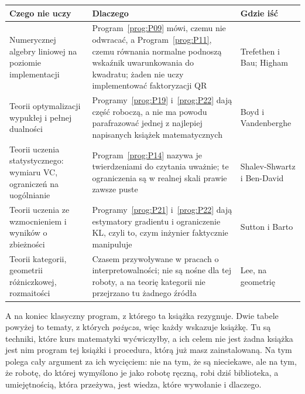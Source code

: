 \begin{center}
\begin{tabularx}{\linewidth}{@{}XXl@{}}
\toprule
\textbf{Czego nie uczy} & \textbf{Dlaczego} & \textbf{Gdzie iść} \\
\midrule
Numerycznej algebry liniowej na poziomie implementacji & Program~\ref{prog:P09}
  mówi, czemu nie odwracać, a Program~\ref{prog:P11}, czemu równania normalne
  podnoszą wskaźnik uwarunkowania do kwadratu; żaden nie uczy implementować
  faktoryzacji QR & Trefethen i Bau; Higham \\
Teorii optymalizacji wypukłej i pełnej dualności & Programy~\ref{prog:P19}
  i~\ref{prog:P22} dają część roboczą, a nie ma powodu parafrazować jednej z
  najlepiej napisanych książek matematycznych & Boyd i Vandenberghe \\
Teorii uczenia statystycznego: wymiaru VC, ograniczeń na uogólnianie &
  Program~\ref{prog:P14} nazywa je twierdzeniami do czytania uważnie; te
  ograniczenia są w realnej skali prawie zawsze puste & Shalev-Shwartz i
  Ben-David \\
Teorii uczenia ze wzmocnieniem i wyników o zbieżności & Programy~\ref{prog:P21}
  i~\ref{prog:P22} dają estymatory gradientu i ograniczenie KL, czyli to, czym
  inżynier faktycznie manipuluje & Sutton i Barto \\
Teorii kategorii, geometrii różniczkowej, rozmaitości & Czasem przywoływane w
  pracach o interpretowalności; nie są nośne dla tej roboty, a na teorię
  kategorii nie przejrzano tu żadnego źródła & Lee, na geometrię \\
\bottomrule
\end{tabularx}
\end{center}

\medskip
A na koniec klasyczny program, z którego ta książka rezygnuje. Dwie tabele
powyżej to tematy, z których \emph{pożycza}, więc każdy wskazuje książkę. Tu są
techniki, które kurs matematyki wyćwiczyłby, a ich celem nie jest żadna książka
\dash{} jest nim program tej książki i procedura, którą już masz zainstalowaną.
Na tym polega cały argument za ich wycięciem: nie na tym, że są nieciekawe, ale
na tym, że robotę, do której wymyślono je jako robotę ręczną, robi dziś
biblioteka, a umiejętnością, która przeżywa, jest wiedza, które wywołanie i
dlaczego.


